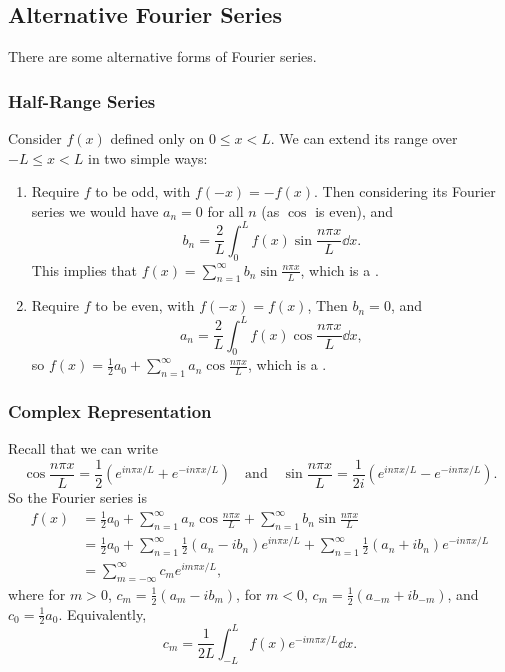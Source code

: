 \subsection{Alternative Fourier Series}

There are some alternative forms of Fourier series.

\subsubsection*{Half-Range Series}

Consider $f(x)$ defined only on $0 \leq x < L$. We can extend its range over $-L \leq x < L$ in two simple ways:
\begin{enumerate}
    \item Require $f$ to be odd, with $f(-x) = -f(x)$. Then considering its Fourier series we would have $a_n = 0$ for all $n$ (as $\cos$ is even), and
    $$
    b_{n}=\frac{2}{L} \int_{0}^{L} f(x) \sin \frac{n \pi x}{L} \dd x.
    $$
    This implies that $f(x) = \sum_{n= 1}^{\infty} b_n \sin \frac{n \pi x}{L}$, which is a .
    \item Require $f$ to be even, with $f(-x) = f(x)$, Then $b_n = 0$, and
    $$
    a_{n}=\frac{2}{L} \int_{0}^{L} f(x) \cos \frac{n \pi x}{L} \dd x,
    $$
    so $f(x) = \frac{1}{2}a_0 + \sum_{n = 1}^{\infty} a_n \cos\frac{n \pi x}{L}$, which is a .
\end{enumerate}

\subsubsection*{Complex Representation}

Recall that we can write
$$
\cos \frac{n \pi x}{L} = \frac{1}{2}\left(e^{in \pi x/L} + e^{-i n \pi x/L}\right) \quad \text{and} \quad \sin \frac{n \pi x}{L} = \frac{1}{2i} \left(e^{i n \pi x/L} - e^{-i n \pi x/L} \right).
$$
So the Fourier series is
\begin{align*}
    f(x) &= \frac{1}{2} a_{0}+\sum_{n=1}^{\infty} a_{n} \cos \frac{n \pi x}{L}+\sum_{n=1}^{\infty} b_{n} \sin \frac{n \pi x}{L} \\
    &= \frac{1}{2} a_{0}+\sum_{n=1}^{\infty}\frac{1}{2}\left(a_{n}-i b_{n}\right) e^{i n \pi x / L}+\sum_{n=1}^{\infty}\frac{1}{2}\left(a_{n}+i b_{n}\right) e^{-i n \pi  x / L} \\
    &= \sum_{m=-\infty}^{\infty} c_{m} e^{i m \pi x / L},
\end{align*}
where for $m > 0$, $c_m = \frac{1}{2}(a_m - i b_m)$, for $m < 0$, $c_m = \frac{1}{2}(a_{-m} + i b_{-m})$, and $c_0 = \frac{1}{2}a_0$. Equivalently,
$$
c_m = \frac{1}{2L} \int_{-L}^L f(x) e^{-i m \pi x/L } \dd x.
$$

